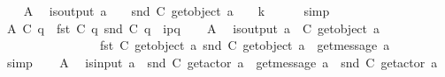 \begin{isabellebody}
\ \ \isamarkupfalse%
\ A{}\ \isamarkupfalse%
\ {\isachardoublequoteopen}is{\isacharunderscore}{\kern0pt}output\ a\ {\isasymLongrightarrow}\ {\isacharparenleft}{\kern0pt}\ {\isacharbar}{\kern0pt}\ {\isacharparenleft}{\kern0pt}snd\ {\isacharparenleft}{\kern0pt}C{}\ {\isacharparenleft}{\kern0pt}get{\isacharunderscore}{\kern0pt}object\ a{\isacharparenright}{\kern0pt}{\isacharparenright}{\kern0pt}{\isacharparenright}{\kern0pt}\ {\isacharbar}{\kern0pt}\ {\isacharparenright}{\kern0pt}\ {\isacharless}{\kern0pt}\isactrlsub {\isasymB}\ k{\isachardoublequoteclose}\isanewline
\ \ \ \ \isamarkupfalse%
\ simp\isanewline
\ \ \isamarkupfalse%
\ A{}{\isacharcolon}{\kern0pt}\ {\isachardoublequoteopen}C{}\ q\ {\isacharequal}{\kern0pt}\ {\isacharparenleft}{\kern0pt}fst\ {\isacharparenleft}{\kern0pt}C{}\ q{\isacharparenright}{\kern0pt}{\isacharcomma}{\kern0pt}\ snd\ {\isacharparenleft}{\kern0pt}C{}\ q{\isacharparenright}{\kern0pt}\ {\isasymcdot}\ {\isacharbrackleft}{\kern0pt}i\isactrlbsup p{\isasymrightarrow}q\isactrlesup {\isacharbrackright}{\kern0pt}{\isacharparenright}{\kern0pt}{\isachardoublequoteclose}\isanewline
\ \ \isamarkupfalse%
\ A{}\ \isamarkupfalse%
\ {\isachardoublequoteopen}is{\isacharunderscore}{\kern0pt}output\ a\ {\isasymLongrightarrow}\ C{}\ {\isacharparenleft}{\kern0pt}get{\isacharunderscore}{\kern0pt}object\ a{\isacharparenright}{\kern0pt}\ {\isacharequal}{\kern0pt}\isanewline
\ \ \ \ \ \ \ \ \ \ \ \ \ \ \ \ {\isacharparenleft}{\kern0pt}fst\ {\isacharparenleft}{\kern0pt}C{}\ {\isacharparenleft}{\kern0pt}get{\isacharunderscore}{\kern0pt}object\ a{\isacharparenright}{\kern0pt}{\isacharparenright}{\kern0pt}{\isacharcomma}{\kern0pt}\ {\isacharparenleft}{\kern0pt}snd\ {\isacharparenleft}{\kern0pt}C{}\ {\isacharparenleft}{\kern0pt}get{\isacharunderscore}{\kern0pt}object\ a{\isacharparenright}{\kern0pt}{\isacharparenright}{\kern0pt}{\isacharparenright}{\kern0pt}\ {\isasymcdot}\ {\isacharbrackleft}{\kern0pt}get{\isacharunderscore}{\kern0pt}message\ a{\isacharbrackright}{\kern0pt}{\isacharparenright}{\kern0pt}{\isachardoublequoteclose}\isanewline
\ \ \ \ \isamarkupfalse%
\ simp\isanewline
\ \ \isamarkupfalse%
\ A{}\ \isamarkupfalse%
\ {\isachardoublequoteopen}is{\isacharunderscore}{\kern0pt}input\ a\ {\isasymLongrightarrow}\ {\isacharparenleft}{\kern0pt}snd\ {\isacharparenleft}{\kern0pt}C{}\ {\isacharparenleft}{\kern0pt}get{\isacharunderscore}{\kern0pt}actor\ a{\isacharparenright}{\kern0pt}{\isacharparenright}{\kern0pt}{\isacharparenright}{\kern0pt}\ {\isacharequal}{\kern0pt}\ {\isacharbrackleft}{\kern0pt}get{\isacharunderscore}{\kern0pt}message\ a{\isacharbrackright}{\kern0pt}\ {\isasymcdot}\ snd\ {\isacharparenleft}{\kern0pt}C{}\ {\isacharparenleft}{\kern0pt}get{\isacharunderscore}{\kern0pt}actor\ a{\isacharparenright}{\kern0pt}{\isacharparenright}{\kern0pt}{\isachardoublequoteclose}\isanewline

\end{isabellebody}
